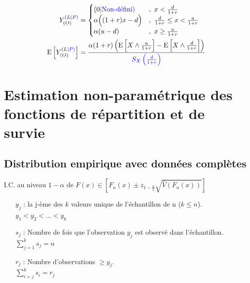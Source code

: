 \documentclass[10pt, french]{article}
\begin{document}
\begin{multicols*}{3}
\begin{align*}
Y^{(L\textcolor{blue}{|P)}}_{(O)} &= 
\begin{cases}
(0 {\color{blue}{| \text{Non-défini})}}		& ,\ x  < \frac{d}{1+r} \\
\alpha \Big( (1+r) x - d \Big)	& ,\ \frac{d}{1+r} \leq x < \frac{u}{1+r} \\
\alpha (u-d)		& ,\ x \geq \frac{u}{1+r} 
\\
\end{cases}
\\
\mathrm{E} \left[ Y^{(L\textcolor{blue}{|P)}}_{(O)} \right] &= \frac{\alpha (1+r) \left( \mathrm{E} \left[ X \wedge \frac{u}{1+r} \right] - \mathrm{E} \left[ X \wedge \frac{d}{1+r} \right]   \right)}{{\color{blue}{S_X \left( \frac{d}{1+r} \right)}}} 
\end{align*}

\setcounter{section}{13}
\columnbreak
\section{Estimation non-paramétrique des fonctions de répartition et de survie}

\subsection*{Distribution empirique avec données complètes}

I.C. au niveau $1 - \alpha$ de $F(x) \in \left[F_n(x) \pm z_{1 - \frac{\alpha}{2}} \sqrt{\widehat{V}(F_n(x))} \right]$
\begin{enumerate}
	\item[$y_j$ : ] la j-ème des $k$ valeurs unique de l'échantillon de n ($k \le n$).\\
	$y_1 < y_2 < \dots < y_k$
	\item[$s_j$ : ] Nombre de fois que l'observation $y_j$ est observé dans l'échantillon.\\
	$\sum_{j = 1}^{k}s_j = n$
	\item[$r_j$ : ] Nombre d'observations $\ge y_j$. \\
	$\sum_{i = j}^{k}s_i = r_j$
\end{enumerate}


\end{multicols*}
\end{document}
